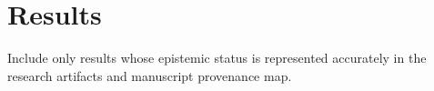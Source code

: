 \section{Results}
\label{sec:results}

Include only results whose epistemic status is represented accurately in the
research artifacts and manuscript provenance map.


